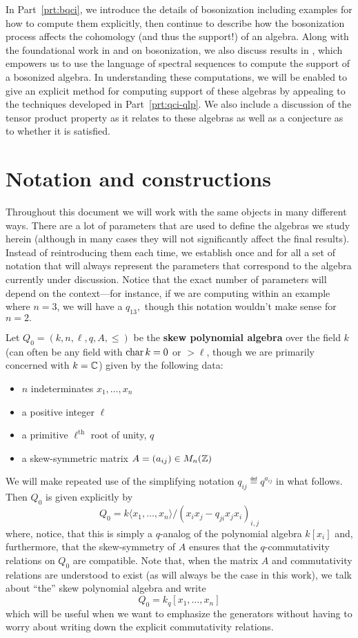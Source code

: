 \documentclass [11pt, proquest] {uwthesis}[2020/02/24]
\begin{document}
    In Part~\ref{prt:bqci}, we introduce the details of bosonization including examples for how to compute them explicitly, then continue to describe how the bosonization process affects the cohomology (and thus the support!) of an algebra. Along with the foundational work in \cite{radford-product} and \cite{majid-bosonization} on bosonization, we also discuss results in \cite{lorenzlorenz95}, which empowers us to use the language of spectral sequences to compute the support of a bosonized algebra. In understanding these computations, we will be enabled to give an explicit method for computing support of these algebras by appealing to the techniques developed in Part~\ref{prt:qci-qlp}. We also include a discussion of the tensor product property as it relates to these algebras as well as a conjecture as to whether it is satisfied.

\section{Notation and constructions}\label{sec:notation}
    Throughout this document we will work with the same objects in many different ways. There are a lot of parameters that are used to define the algebras we study herein (although in many cases they will not significantly affect the final results). Instead of reintroducing them each time, we establish once and for all a set of notation that will always represent the parameters that correspond to the algebra currently under discussion. Notice that the exact number of parameters will depend on the context---for instance, if we are computing within an example where $n=3$, we will have a $q_{13},$ though this notation wouldn't make sense for $n=2.$
    
    Let $Q_0=(k, n, \ell, q, A, \le)$ be the \textbf{skew polynomial algebra} over the field $k$ (can often be any field with $\operatorname{char} k=0$ or $>\ell$, though we are primarily concerned with $k=\mathbb{C}$) given by the following data:
    \begin{itemize}
        \item $n$ indeterminates $x_1,\dots, x_n$
        \item a positive integer $\ell$
        \item a primitive $\ell^\text{th}$ root of unity, $q$
        \item a skew-symmetric matrix $A=(a_{ij})\in M_n(\mathbb{Z})$
    \end{itemize}
    We will make repeated use of the simplifying notation $q_{ij}\eqdef q^{a_{ij}}$ in what follows. Then $Q_0$ is given explicitly by
    \[Q_0=k\langle x_1,\dots,x_n\rangle/(x_ix_j-q_{ji}x_jx_i)_{i,j}\]
    where, notice, that this is simply a $q$-analog of the polynomial algebra $k[x_i]$ and, furthermore, that the skew-symmetry of $A$ ensures that the $q$-commutativity relations on $Q_0$ are compatible. Note that, when the matrix $A$ and commutativity relations are understood to exist (as will always be the case in this work), we talk about ``the'' skew polynomial algebra and write
    \[Q_0 = k_q[x_1,\dots,x_n]\]
    which will be useful when we want to emphasize the generators without having to worry about writing down the explicit commutativity relations.
    
\end{document}
